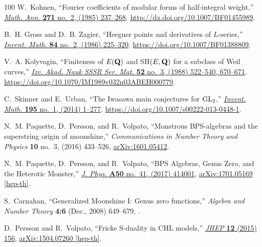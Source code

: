 \documentclass[11pt,a4paper,fontset=windows]{ctexart}
\numberwithin{equation}{section}
\begin{document}
\begin{thebibliography}{100}
W.~Kohnen, ``Fourier coefficients of modular forms of half-integral weight,''
  \href{http://dx.doi.org/10.1007/BF01455989}{{\em Math. Ann.} {\bfseries 271}
  no.~2, (1985) 237--268}. \url{http://dx.doi.org/10.1007/BF01455989}.

B.~H. Gross and D.~B. Zagier, ``Heegner points and derivatives of
  {$L$}-series,'' \href{http://dx.doi.org/10.1007/BF01388809}{{\em Invent.
  Math.} {\bfseries 84} no.~2, (1986) 225--320}.
  \url{https://doi.org/10.1007/BF01388809}.

V.~A. Kolyvagin, ``Finiteness of {$E({\bf Q})$} and {{SH}}{$(E,{\bf Q})$} for a
  subclass of {W}eil curves,''
  \href{http://dx.doi.org/10.1070/IM1989v032n03ABEH000779}{{\em Izv. Akad. Nauk
  SSSR Ser. Mat.} {\bfseries 52} no.~3, (1988) 522--540, 670--671}.
  \url{https://doi.org/10.1070/IM1989v032n03ABEH000779}.

C.~Skinner and E.~Urban, ``The {I}wasawa main conjectures for {$\rm GL_2$},''
  \href{http://dx.doi.org/10.1007/s00222-013-0448-1}{{\em Invent. Math.}
  {\bfseries 195} no.~1, (2014) 1--277}.
  \url{https://doi.org/10.1007/s00222-013-0448-1}.

N.~M. Paquette, D.~Persson, and R.~Volpato, ``{Monstrous BPS-algebras and the
  superstring origin of moonshine},'' {\em Communications in Number Theory and
  Physics} {\bfseries 10} no.~3, (2016) 433--526,
  \href{http://arxiv.org/abs/arXiv:1601.05412}{{\ttfamily arXiv:1601.05412}}.

N.~M. Paquette, D.~Persson, and R.~Volpato, ``{BPS Algebras, Genus Zero, and
  the Heterotic Monster},''
  \href{http://dx.doi.org/10.1088/1751-8121/aa8443}{{\em J. Phys.} {\bfseries
  A50} no.~41, (2017) 414001},
\href{http://arxiv.org/abs/1701.05169}{{\ttfamily arXiv:1701.05169 [hep-th]}}.

S.~Carnahan, ``{Generalized Moonshine I: Genus zero functions},'' {\em Algebra
  and Number Theory} {\bfseries 4:6} (Dec., 2008) 649--679,
  \href{http://arxiv.org/abs/0812.3440}{{}}.

D.~Persson and R.~Volpato, ``{Fricke S-duality in CHL models},''
  \href{http://dx.doi.org/10.1007/JHEP12(2015)156}{{\em JHEP} {\bfseries 12}
  (2015) 156},
\href{http://arxiv.org/abs/1504.07260}{{\ttfamily arXiv:1504.07260 [hep-th]}}.


\end{thebibliography}
\end{document}
